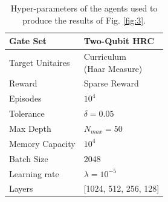\documentclass[%
 aip,
 floatfix,
 amsmath,amssymb,
 reprint,%
]{revtex4-1}
\begin{document}
\begin{table}[h]
\caption{Hyper-parameters of the agents used to produce the results of Fig. \ref{fig:3}.}
\label{tab:tab2}

\begin{tabular}{|l|l|}
\hline
Gate Set & Two-Qubit HRC\\ \hline
Target Unitaires & \pbox{20cm}{Curriculum \\ (Haar Measure)}\\ \hline
Reward & Sparse Reward \\ \hline
Episodes & $10^{4}$\\ \hline
Tolerance & $\delta = 0.05$ \\ \hline
Max Depth & $N_{max}=50$ \\ \hline
Memory Capacity & $10^4$ \\ \hline
Batch Size & 2048  \\ \hline
Learning rate & $\lambda = 10^{-5}$  \\ \hline
Layers & [1024, 512, 256, 128]  \\ \hline
\end{tabular}
\end{table}
\end{document}

